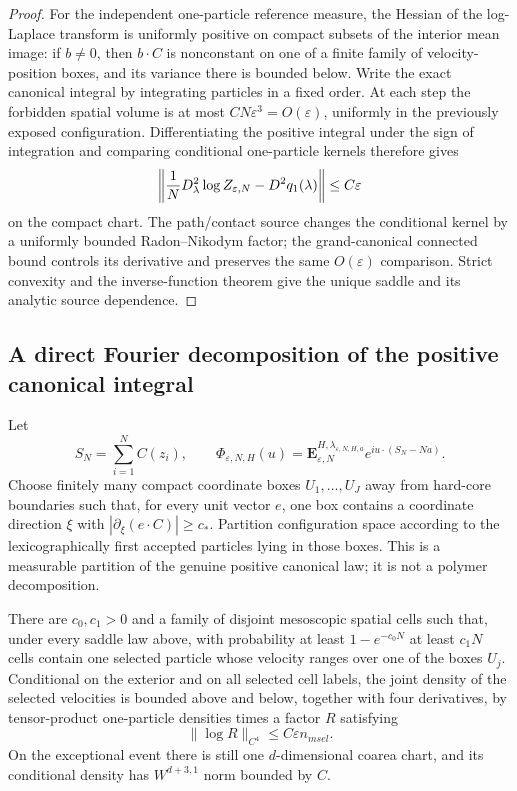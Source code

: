 \begin{proof}
For the independent one-particle reference measure, the Hessian of the
log-Laplace transform is uniformly positive on compact subsets of the
interior mean image: if $b\ne0$, then $b\cdot C$ is nonconstant on one of a
finite family of velocity-position boxes, and its variance there is bounded
below.  Write the exact canonical integral by integrating particles in a
fixed order.  At each step the forbidden spatial volume is at most
$C N\varepsilon^3=O(\varepsilon)$, uniformly in the previously exposed
configuration.  Differentiating the positive integral under the sign of
integration and comparing conditional one-particle kernels therefore gives
\[
 \left\|{1\over N}D^2_\lambda\log Z_{\varepsilon,N}
       -D^2q_1(\lambda)\right\|\le C\varepsilon
\]
on the compact chart.  The path/contact source changes the conditional kernel
by a uniformly bounded Radon--Nikodym factor; the grand-canonical connected
bound controls its derivative and preserves the same $O(\varepsilon)$
comparison.  Strict convexity and the inverse-function theorem give the
unique saddle and its analytic source dependence.
\end{proof}

\subsection{A direct Fourier decomposition of the positive canonical integral}

Let
\[
 S_N=\sum_{i=1}^NC(z_i),\qquad
 \Phi_{\varepsilon,N,H}(u)
 =\mathbf E_{\varepsilon,N}^{H,\lambda_{\varepsilon,N,H,a}}
 e^{iu\cdot(S_N-Na)}.
\]
Choose finitely many compact coordinate boxes $U_1,\ldots,U_J$ away from
hard-core boundaries such that, for every unit vector $e$, one box contains a
coordinate direction $\xi$ with
$|\partial_\xi(e\cdot C)|\ge c_*$.  Partition configuration space according
to the lexicographically first accepted particles lying in those boxes.  This
is a measurable partition of the genuine positive canonical law; it is not a
polymer decomposition.

\begin{lemma}
\label{lem:r17-b1-cell}
There are $c_0,c_1>0$ and a family of disjoint mesoscopic spatial cells such
that, under every saddle law above, with probability at least
$1-e^{-c_0N}$ at least $c_1N$ cells contain one selected particle whose
velocity ranges over one of the boxes $U_j$.  Conditional on the exterior and
on all selected cell labels, the joint density of the selected velocities is
bounded above and below, together with four derivatives, by tensor-product
one-particle densities times a factor $R$ satisfying
\[
 \|\log R\|_{C^4}\le C\varepsilon n_{
m sel}.
\]
On the exceptional event there is still one $d$-dimensional coarea chart,
and its conditional density has $W^{d+3,1}$ norm bounded by $C$.
\end{lemma}

